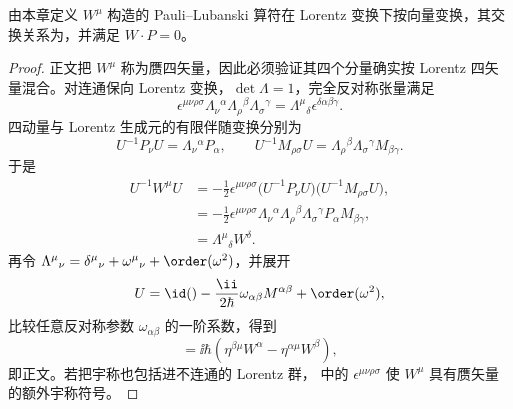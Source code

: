 \begin{proposition}
由本章定义 $W^\mu$ 构造的 Pauli--Lubanski 算符在 Lorentz 变换下按向量变换，其交换关系为，并满足 $W\cdot P=0$。
\end{proposition}
\begin{proof}
正文把 $W^\mu$ 称为赝四矢量，因此必须验证其四个分量确实按 Lorentz 四矢量混合。对连通保向 Lorentz 变换，$\det\Lambda=1$，完全反对称张量满足
\begin{equation*}
 \epsilon^{\mu\nu\rho\sigma}
 \Lambda_\nu{}^{\alpha}\Lambda_\rho{}^{\beta}\Lambda_\sigma{}^{\gamma}
 =\Lambda^\mu{}_{\delta}\epsilon^{\delta\alpha\beta\gamma}.
\end{equation*}
四动量与 Lorentz 生成元的有限伴随变换分别为
\begin{equation*}
 U^{-1}P_\nu U=\Lambda_\nu{}^{\alpha}P_\alpha,
 \qquad
 U^{-1}M_{\rho\sigma}U
 =\Lambda_\rho{}^{\beta}\Lambda_\sigma{}^{\gamma}M_{\beta\gamma}.
\end{equation*}
于是
\begin{align*}
 U^{-1}W^\mu U
 &=-\frac12\epsilon^{\mu\nu\rho\sigma}
 \bigl(U^{-1}P_\nu U\bigr)
 \bigl(U^{-1}M_{\rho\sigma}U\bigr),\\
 &=-\frac12\epsilon^{\mu\nu\rho\sigma}
 \Lambda_\nu{}^{\alpha}\Lambda_\rho{}^{\beta}\Lambda_\sigma{}^{\gamma}
 P_\alpha M_{\beta\gamma},\\
 &=\Lambda^\mu{}_{\delta}W^\delta.
\end{align*}
再令 $\Lambda^\mu{}_{\nu}=\delta^\mu{}_{\nu}+\omega^\mu{}_{\nu}+\order(\omega^2)$，并展开
\begin{equation*}
 U=\id()-\frac{\ii}{2\hbar}\omega_{\alpha\beta}M^{\alpha\beta}
 +\order(\omega^2),
\end{equation*}
比较任意反对称参数 $\omega_{\alpha\beta}$ 的一阶系数，得到
\begin{equation*}
 [M^{\alpha\beta},W^\mu]
 =\ii\hbar\left(\eta^{\beta\mu}W^\alpha-
 \eta^{\alpha\mu}W^\beta\right),
\end{equation*}
即正文。若把宇称也包括进不连通的 Lorentz 群， 中的 $\epsilon^{\mu\nu\rho\sigma}$ 使 $W^\mu$ 具有赝矢量的额外宇称符号。
\end{proof}


